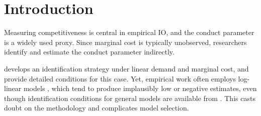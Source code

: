 \documentclass[11pt, a4paper]{article}
\theoremstyle{remark}
\begin{document}
\section{Introduction}

Measuring competitiveness is central in empirical IO, and the conduct parameter is a widely used proxy.
Since marginal cost is typically unobserved, researchers identify and estimate the conduct parameter indirectly.

\citet{bresnahan1982oligopoly} develops an identification strategy under linear demand and marginal cost, and \citet{matsumura2023resolving} provide detailed conditions for this case.
Yet, empirical work often employs log-linear models \citep{okazaki2022excess,merel2009measuring}, which tend to produce implausibly low or negative estimates, even though identification conditions for general models are available from \citet{lau1982identifying}.
This casts doubt on the methodology and complicates model selection.
\end{document}
